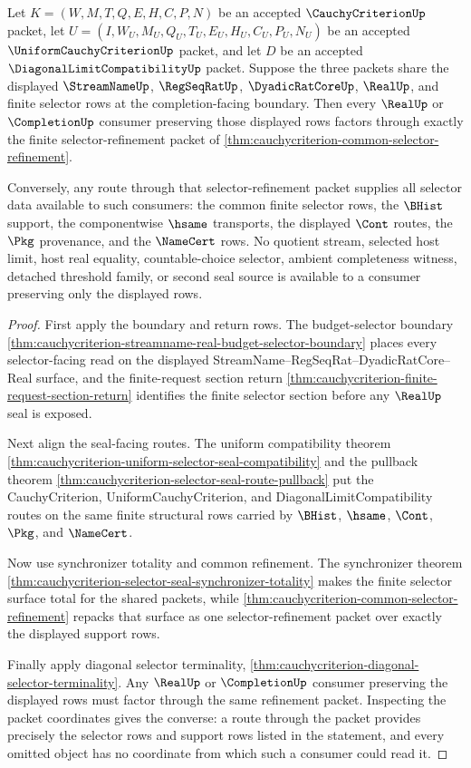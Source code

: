 \begin{theorem}
\label{thm:cauchycriterion-finite-selector-exhaustion}
Let $K=(W,M,T,Q,E,H,C,P,N)$ be an accepted $\CauchyCriterionUp$ packet, let
$U=(I,W_U,M_U,Q_U,T_U,E_U,H_U,C_U,P_U,N_U)$ be an accepted
$\UniformCauchyCriterionUp$ packet, and let $D$ be an accepted
$\DiagonalLimitCompatibilityUp$ packet. Suppose the three packets share the
displayed $\StreamNameUp$, $\RegSeqRatUp$, $\DyadicRatCoreUp$, $\RealUp$, and
finite selector rows at the completion-facing boundary. Then every $\RealUp$
or $\CompletionUp$ consumer preserving those displayed rows factors through
exactly the finite selector-refinement packet of
\autoref{thm:cauchycriterion-common-selector-refinement}.

Conversely, any route through that selector-refinement packet supplies all
selector data available to such consumers: the common finite selector rows,
the $\BHist$ support, the componentwise $\hsame$ transports, the displayed
$\Cont$ routes, the $\Pkg$ provenance, and the $\NameCert$ rows. No quotient
stream, selected host limit, host real equality, countable-choice selector,
ambient completeness witness, detached threshold family, or second seal source
is available to a consumer preserving only the displayed rows.
\end{theorem}
\begin{proof}
First apply the boundary and return rows. The budget-selector boundary
\autoref{thm:cauchycriterion-streamname-real-budget-selector-boundary} places
every selector-facing read on the displayed StreamName--RegSeqRat--DyadicRatCore--Real
surface, and the finite-request section return
\autoref{thm:cauchycriterion-finite-request-section-return} identifies the
finite selector section before any $\RealUp$ seal is exposed.

Next align the seal-facing routes. The uniform compatibility theorem
\autoref{thm:cauchycriterion-uniform-selector-seal-compatibility} and the
pullback theorem \autoref{thm:cauchycriterion-selector-seal-route-pullback}
put the CauchyCriterion, UniformCauchyCriterion, and DiagonalLimitCompatibility
routes on the same finite structural rows carried by $\BHist$, $\hsame$,
$\Cont$, $\Pkg$, and $\NameCert$.

Now use synchronizer totality and common refinement. The synchronizer theorem
\autoref{thm:cauchycriterion-selector-seal-synchronizer-totality} makes the
finite selector surface total for the shared packets, while
\autoref{thm:cauchycriterion-common-selector-refinement} repacks that surface
as one selector-refinement packet over exactly the displayed support rows.

Finally apply diagonal selector terminality,
\autoref{thm:cauchycriterion-diagonal-selector-terminality}. Any $\RealUp$ or
$\CompletionUp$ consumer preserving the displayed rows must factor through the
same refinement packet. Inspecting the packet coordinates gives the converse:
a route through the packet provides precisely the selector rows and support
rows listed in the statement, and every omitted object has no coordinate from
which such a consumer could read it.
\end{proof}
